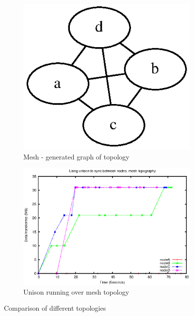 \documentclass[12pt]{article}
\begin{document}
\begin{figure}[htp]
    \begin{subfigure}[b]{0.5\linewidth}
        \centering
        \includegraphics[scale=0.5]{images/mesh-graph.eps}
        \caption{Mesh - generated graph of topology}
        \label{fig:full_mesh_graph}
    \end{subfigure}
    \begin{subfigure}[b]{0.5\linewidth}
        \centering
        \includegraphics[scale=0.5]{images/mesh-uni-10-aite.eps}
        \caption{Unison running over mesh topology}
        \label{fig:full_mesh_uni}
    \end{subfigure}
    \caption{Comparison of different topologies}
\end{figure}

\newpage
\end{document}
